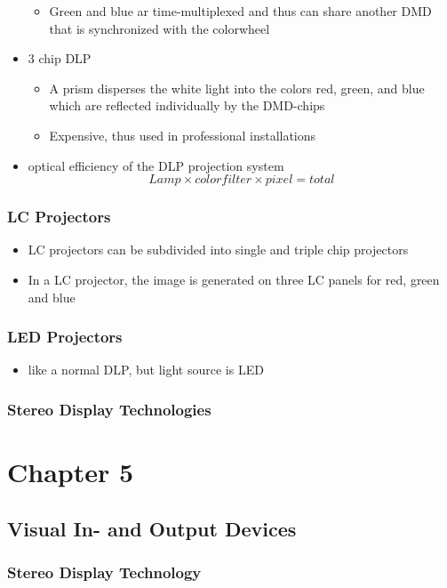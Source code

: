 \documentclass{standalone}
\begin{document}
\begin{itemize}
\begin{itemize}
\item Green and blue ar time-multiplexed and thus can share another DMD that is synchronized with the colorwheel
\end{itemize}
\item 3 chip DLP
\begin{itemize}
\item A prism disperses the white light into the colors red, green, and blue which are reflected individually by the DMD-chips
\item Expensive, thus used in professional installations
\end{itemize}
\item optical efficiency of the DLP projection system $$ Lamp \times colorfilter \times pixel = total$$
\end{itemize}
\subsubsection*{LC Projectors}
\begin{itemize}
\item LC projectors can be subdivided into single and triple chip projectors
\item In a LC projector, the image is generated on three LC panels for red, green and blue
\end{itemize}
\subsubsection*{LED Projectors}
\begin{itemize}
\item like a normal DLP, but light source is LED
\end{itemize}
\subsubsection{Stereo Display Technologies}

\section{Chapter 5}

\subsection{Visual In- and Output Devices}

\subsubsection*{Stereo Display Technology}
\end{document}
